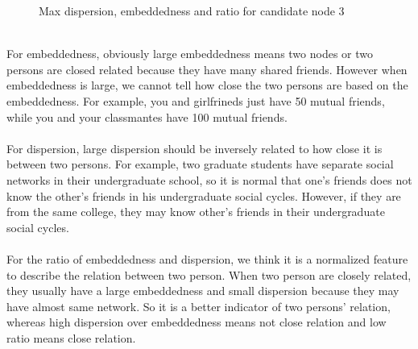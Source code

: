 \documentclass{article}
\begin{document}
\begin{figure}[htbp]
{}
\caption{Max dispersion, embeddedness and ratio for candidate node 3}
\label{fig:p5_111213}
\end{figure}
\newpage
~\\
For embeddedness, obviously large embeddedness means two nodes or two persons are closed related because they have many shared friends. However when embeddedness is large, we cannot tell how close the two persons are based on the embeddedness. For example, you and girlfrineds just have 50 mutual friends, while you and your classmantes have 100 mutual friends.\\
\\
For dispersion, large dispersion should be inversely related to how close it is between two persons. For example, two graduate students have separate social networks in their undergraduate school, so it is normal that one's friends does not know the other's friends in his undergraduate social cycles. However, if they are from the same college, they may know other's friends in their undergraduate social cycles. \\
\\
For the ratio of embeddedness and dispersion, we think it is a normalized feature to describe the relation between two person. When two person are closely related, they usually have a large embeddedness and small dispersion because they may have almost same network. So it is a better indicator of two persons' relation, whereas high dispersion over embeddedness means not close relation and low ratio means close relation.\\
\end{document}
